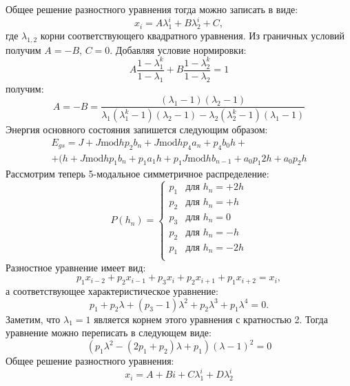 Общее решение разностного уравнения тогда можно записать в виде:
\begin{equation}
x_i = A \lambda_1^i + B \lambda_2^i + C,
\end{equation}
где $\lambda_{1,2}$ корни соответствующего квадратного уравнения.
Из граничных условий получим $A=-B$, $C=0$. Добавляя условие нормировки:
\begin{equation}
A \frac{1-\lambda_1^k}{1-\lambda_1} + B \frac{1-\lambda_2^k}{1-\lambda_2} =1
\end{equation}
получим:
\begin{equation}
A=-B = \frac{(\lambda_1-1)(\lambda_2-1)}{\lambda_1(\lambda_1^k-1)(\lambda_2-1) - \lambda_2(\lambda_2^k-1)(\lambda_1-1)}
\end{equation}
Энергия основного состояния запишется следующим образом:
\begin{multline}
E_{gs} = J + J \text{mod} h p_2 b_n + J \text{mod} h p_4 a_n + p_4 b_0 h+\\
+ (h + J \text{mod} h p_1 b_n + p_1 a_1 h +p_1J \text{mod} h b_{n-1} + a_0 p_1 2 h + a_0 p_2 h 
\end{multline}
Рассмотрим теперь 5-модальное симметричное распределение:
\begin{equation}
P(h_n) =
\begin{cases}
	p_1 &\mbox{для } h_n= +2h \\
	p_2 &\mbox{для } h_n= +h \\
	p_3 &\mbox{для } h_n= 0\\
	p_2 &\mbox{для } h_n = -h\\
	p_1&\mbox{для } h_n = -2h\\
\end{cases}
\end{equation}
Разностное уравнение имеет вид:
\begin{equation}
p_1 x_{i-2} + p_2 x_{i-1} + p_3 x_i + p_2 x_{i+1} + p_1 x_{i+2} = x_i,
\end{equation}
а соответствующее характеристическое уравнение:
\begin{equation}
p_1 + p_2 \lambda + (p_3-1) \lambda^2 + p_2 \lambda^3 + p_1 \lambda^4 = 0.
\end{equation}
Заметим, что $\lambda_1=1$ является корнем этого уравнения с кратностью 2. Тогда уравнение можно переписать в следующем виде:
\begin{equation}
(p_1\lambda^2 - (2p_1+p_2) \lambda + p_1) (\lambda - 1)^2 =0
\end{equation}
Общее решение разностного уравнения:
\begin{equation}
x_i = A + B i + C \lambda_1^i + D \lambda_2^i
\end{equation}
